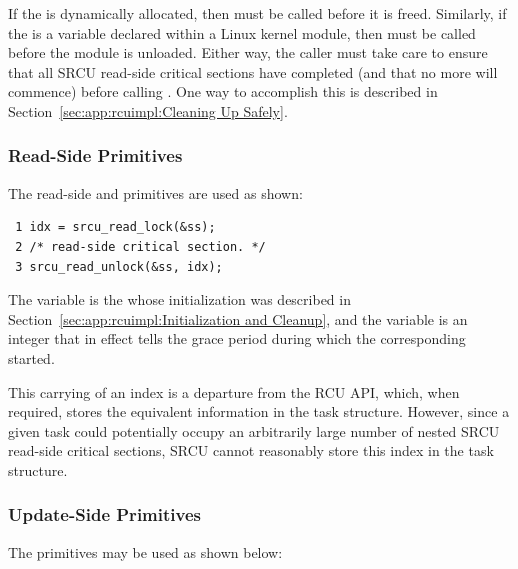 If the   is dynamically allocated, then
 must be called before it is freed.
Similarly, if the   is a variable declared within
a Linux kernel module, then  must be called
before the module is unloaded.
Either way, the caller must take care to ensure that all SRCU read-side
critical sections have completed (and that no more will commence) before
calling .
One way to accomplish this is described in
Section~\ref{sec:app:rcuimpl:Cleaning Up Safely}.

\subsubsection{Read-Side Primitives}
\label{sec:app:rcuimpl:Read-Side Primitives}

The read-side  and  primitives
are used as shown:

\vspace{5pt}
\begin{minipage}[t]{\columnwidth}
\scriptsize
\begin{verbatim}
 1 idx = srcu_read_lock(&ss);
 2 /* read-side critical section. */
 3 srcu_read_unlock(&ss, idx);
\end{verbatim}
\end{minipage}
\vspace{5pt}

The  variable is the   whose initialization
was described in Section~\ref{sec:app:rcuimpl:Initialization and Cleanup},
and the  variable is an integer that in effect tells
 the grace period during which the corresponding
 started.

This carrying of an index is a departure from the RCU API, which,
when required, stores the equivalent information in the task structure.
However, since a given task could potentially occupy an arbitrarily large
number of nested SRCU read-side critical sections, SRCU cannot
reasonably store this index in the task structure.

\subsubsection{Update-Side Primitives}
\label{sec:app:rcuimpl:Update-Side Primitives}

The  primitives may be used as shown below:

